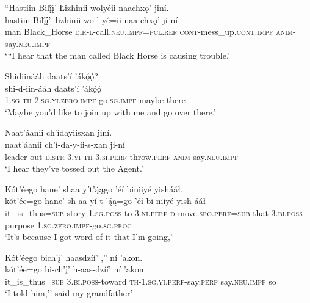 \ea\label{ex:text2-13-1}
``Hastiin Bilį́į́’ Łizhinii wolyéii naachxǫ’ jiní.\\
\gll hastiin	Bilį́į́’~{łizhinii}	wo-l-yé=ii	naa-chxǫ’	ji-ní\\
     man	Black\_Horse	\textsc{dir}-\textsc{l}-call.\textsc{neu}.\textsc{impf}=\textsc{pcl}.\textsc{ref}	\textsc{cont}-mess\_up.\textsc{cont}.\textsc{impf}	\textsc{anim}-say.\textsc{neu}.\textsc{impf}\\
\glt `{``}I hear that the man called Black Horse is causing trouble.'
\z

\ea\label{ex:text2-13-2}
Shidiinááh daats’í ’ákǫ́ǫ́?\\
\gll shi-d-iin-ááh	daats’í	’ákǫ́ǫ́\\
     1.\textsc{sg}-\textsc{th}-2.\textsc{sg}.\textsc{yi}.\textsc{zero}.\textsc{impf}-go.\textsc{sg}.\textsc{impf}	maybe	there\\
\glt `Maybe you'd like to join up with me and go over there.'
\z

\newpage
\ea\label{ex:text2-13-3}
Naat’áanii ch’ídayiisxan jiní.\\
\gll naat’áanii	ch’í-da-y-ii-s-xan	ji-ní\\
     leader	out-\textsc{distr}-3.\textsc{yi}-\textsc{th}-3.\textsc{si}.\textsc{perf}-throw.\textsc{perf}	\textsc{anim}-say.\textsc{neu}.\textsc{impf}\\
\glt `I hear they've tossed out the Agent.'
\z

\ea\label{ex:text2-13-4}
Kót’éego hane’ shaa yít’ą́ągo ’éí biniiyé yishááł.\\
\gll kót’ée=go	hane’	sh-aa	yí-t-’ą́ą=go	’éí	bi-niiyé	yish-ááł\\
     it\_is\_thus=\textsc{sub}	story	1.\textsc{sg}.\textsc{poss}-to	3.\textsc{ni}.\textsc{perf}-\textsc{d}-move.\textsc{sro}.\textsc{perf}=\textsc{sub}	that	3.\textsc{bi}.\textsc{poss}-purpose	1.\textsc{sg}.\textsc{zero}.\textsc{impf}-go.\textsc{sg}.\textsc{prog}\\
\glt `It's because I got word of it that I'm going,'
\z

\ea\label{ex:text2-13-5}
Kót’éego bich’į’ haasdzíí’ ,'' ní ’akon.\\
\gll kót’ée=go	bi-ch’į’	h-aas-dzíí’	ní	’akon\\
     it\_is\_thus=\textsc{sub}	3.\textsc{bi}.\textsc{poss}-toward	\textsc{th}-1.\textsc{sg}.\textsc{yi}.\textsc{perf}-say.\textsc{perf}	say.\textsc{neu}.\textsc{impf}	so\\
\glt `I told him,'' said my grandfather'
\z


